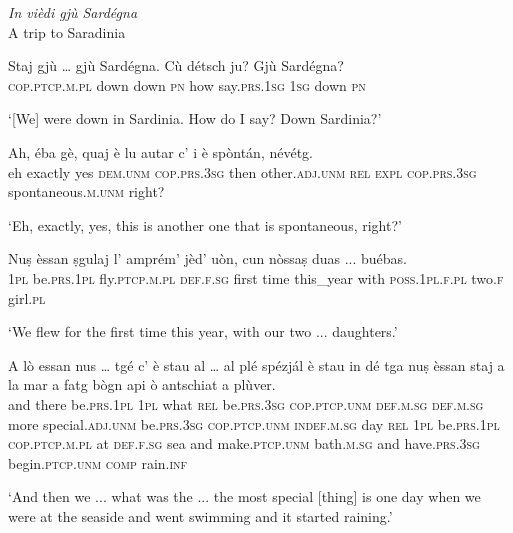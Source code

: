 \textit{In vièdi gjù Sardégna}\\
A trip to Saradinia\\
\smallskip

\begin{linenumbers}
	\gll Staj gjù … gjù Sardégna. Cù détsch ju? Gjù Sardégna?\footnotemark{}\\
	\textsc{cop.ptcp.m.pl} down {} down \textsc{pn} how say.\textsc{prs.1sg} \textsc{1sg} down \textsc{pn}\\
\end{linenumbers}
\medskip
\glt `[We] were down in Sardinia. How do I say? Down Sardinia?'
\medskip

\begin{linenumbers}
	\gll Ah, éba gè, quaj è lu autar c’ i è spòntán, névétg.   \\
	eh exactly yes \textsc{dem.unm} \textsc{cop.prs.3sg} then other.\textsc{adj.unm} \textsc{rel} \textsc{expl} \textsc{cop.prs.3sg} spontaneous.\textsc{m.unm} right?\\ 
\end{linenumbers}
\medskip
\glt `Eh, exactly, yes, this is another one that is spontaneous, right?'
\medskip

\begin{linenumbers}
	\gll  Nuṣ èssan ṣgulaj l’ amprém’ jèd’ uòn, cun nòssaṣ duas ... buébas.\\
	\textsc{1pl} be.\textsc{prs.1pl} fly.\textsc{ptcp.m.pl} \textsc{def.f.sg} first time this\_year with \textsc{poss.1pl.f.pl} two.\textsc{f} {} girl.\textsc{pl}\\
\end{linenumbers}
\medskip
\glt `We flew for the first time this year, with our two ... daughters.'
\medskip

\begin{linenumbers}
	\gll  A lò essan nus … tgé c’ è stau al … al plé spézjál è stau in dé tga nuṣ èssan staj a la mar a fatg bògn api ò antschiat a plùver.\\
	and there be.\textsc{prs.1pl} \textsc{1pl} {} what \textsc{rel} be.\textsc{prs.3sg} \textsc{cop.ptcp.unm} \textsc{def.m.sg} {} \textsc{def.m.sg} more special.\textsc{adj.unm} be.\textsc{prs.3sg} \textsc{cop.ptcp.unm} \textsc{indef.m.sg} day \textsc{rel} \textsc{1pl} be.\textsc{prs.1pl} \textsc{cop.ptcp.m.pl} at \textsc{def.f.sg} sea and make.\textsc{ptcp.unm} bath.\textsc{m.sg} and have.\textsc{prs.3sg} begin.\textsc{ptcp.unm} \textsc{comp} rain.\textsc{inf}\\
\end{linenumbers}
\medskip
\glt `And then we ... what was the ... the most special [thing] is one day when we were at the seaside and went swimming and it started raining.'
\medskip

